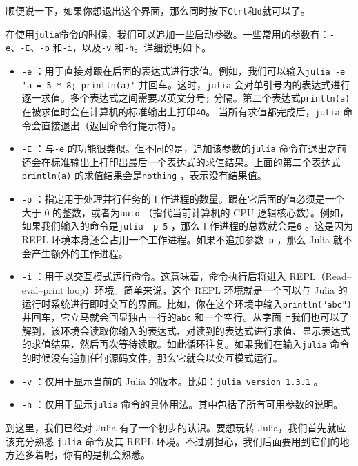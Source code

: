 顺便说一下，如果你想退出这个界面，那么同时按下\verb|Ctrl|和\verb|d|就可以了。

在使用\verb|julia|命令的时候，我们可以追加一些启动参数。一些常用的参数有：\verb|-e|、\verb|-E|、\verb|-p| 和\verb|-i|，以及\verb|-v| 和\verb|-h|。详细说明如下。

\begin{itemize}
\item \verb|-e| ：用于直接对跟在后面的表达式进行求值。例如，我们可以输入\verb|julia -e 'a = 5 * 8; println(a)'| 并回车。这时，\verb|julia| 会对单引号内的表达式进行逐一求值。多个表达式之间需要以英文分号\verb|;| 分隔。第二个表达式\verb|println(a)| 在被求值时会在计算机的标准输出上打印\verb|40|。 当所有求值都完成后，\verb|julia| 命令会直接退出（返回命令行提示符）。
\item \verb|-E| ：与\verb|-e| 的功能很类似。但不同的是，追加该参数的\verb|julia| 命令在退出之前还会在标准输出上打印出最后一个表达式的求值结果。上面的第二个表达式\verb|println(a)| 的求值结果会是\verb|nothing| ，表示没有结果值。
\item \verb|-p| ：指定用于处理并行任务的工作进程的数量。跟在它后面的值必须是一个大于 0 的整数，或者为\verb|auto| （指代当前计算机的 CPU 逻辑核心数）。例如，如果我们输入的命令是\verb|julia -p 5| ，那么工作进程的总数就会是\verb|6| 。这是因为 REPL 环境本身还会占用一个工作进程。如果不追加参数\verb|-p| ，那么 Julia 就不会产生额外的工作进程。
\item \verb|-i| ：用于以交互模式运行命令。这意味着，命令执行后将进入 REPL（Read–eval–print loop）环境。简单来说，这个 REPL 环境就是一个可以与 Julia 的运行时系统进行即时交互的界面。比如，你在这个环境中输入\verb|println("abc")| 并回车，它立马就会回显独占一行的\verb|abc| 和一个空行。从字面上我们也可以了解到，该环境会读取你输入的表达式、对读到的表达式进行求值、显示表达式的求值结果，然后再次等待读取。如此循环往复。如果我们在输入\verb|julia| 命令的时候没有追加任何源码文件，那么它就会以交互模式运行。
\item \verb|-v| ：仅用于显示当前的 Julia 的版本。比如：\verb|julia version 1.3.1| 。
\item \verb|-h| ：仅用于显示\verb|julia| 命令的具体用法。其中包括了所有可用参数的说明。
\end{itemize}

到这里，我们已经对 Julia 有了一个初步的认识。要想玩转 Julia，我们首先就应该充分熟悉 \verb|julia| 命令及其 REPL 环境。不过别担心，我们后面要用到它们的地方还多着呢，你有的是机会熟悉。

